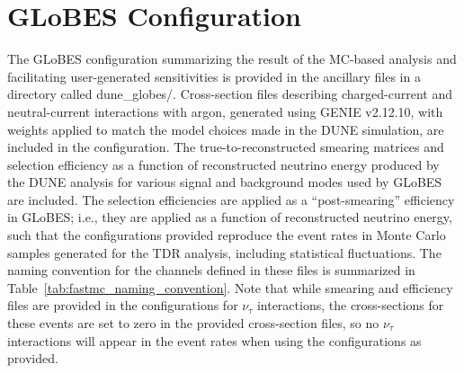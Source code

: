 \documentclass[aps,prd,superscriptaddress]{revtex4-1}
\begin{document}
\section{GLoBES Configuration}
\label{sect:globes}
The GLoBES configuration summarizing the result of the MC-based analysis and facilitating user-generated
sensitivities is provided in the ancillary files in a directory called dune\_globes/.
Cross-section files describing charged-current and neutral-current interactions with argon, generated using
GENIE v2.12.10, with weights applied to match the model choices made in the DUNE simulation, are included in the
configuration.
The true-to-reconstructed smearing matrices and selection efficiency as a function of reconstructed
neutrino energy produced by
the DUNE analysis for various signal
and background modes used by 
GLoBES are included. The selection efficiencies are applied as a ``post-smearing'' efficiency in GLoBES;
i.e., they are applied as a function of reconstructed neutrino energy, such that the configurations
provided reproduce the event rates in Monte Carlo samples generated for
the TDR analysis, including statistical fluctuations.
The naming convention for the channels defined in these files is summarized in
Table~\ref{tab:fastmc_naming_convention}. Note that while smearing and efficiency files are provided in
the configurations for $\nu_\tau$ interactions, the cross-sections for these events are set to zero in the
provided cross-section files, so no $\nu_\tau$ interactions will appear in the event rates when using the
configurations as provided.
\end{document}
